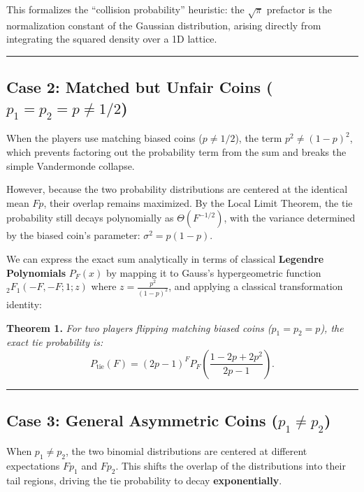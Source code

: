 \documentclass[
  letterpaper,
  DIV=11,
  numbers=noendperiod]{scrartcl}
\begin{document}
This formalizes the ``collision probability'' heuristic: the
\(\sqrt{\pi}\) prefactor is the normalization constant of the Gaussian
distribution, arising directly from integrating the squared density over
a 1D lattice.

\begin{center}\rule{0.5\linewidth}{0.5pt}\end{center}

\subsection{\texorpdfstring{Case 2: Matched but Unfair Coins
(\(p_1 = p_2 = p \neq 1/2\))}{Case 2: Matched but Unfair Coins (p\_1 = p\_2 = p \textbackslash neq 1/2)}}\label{case-2-matched-but-unfair-coins-p_1-p_2-p-neq-12}

When the players use matching biased coins (\(p \neq 1/2\)), the term
\(p^2 \neq (1-p)^2\), which prevents factoring out the probability term
from the sum and breaks the simple Vandermonde collapse.

However, because the two probability distributions are centered at the
identical mean \(F p\), their overlap remains maximized. By the Local
Limit Theorem, the tie probability still decays polynomially as
\(\Theta(F^{-1/2})\), with the variance determined by the biased coin's
parameter: \(\sigma^2 = p(1-p)\).

We can express the exact sum analytically in terms of classical
\textbf{Legendre Polynomials} \(P_F(x)\) by mapping it to Gauss's
hypergeometric function \(_2F_1(-F, -F; 1; z)\) where
\(z = \frac{p^2}{(1-p)^2}\), and applying a classical transformation
identity:

\textbf{Theorem 1.} \emph{For two players flipping matching biased coins
(\(p_1 = p_2 = p\)), the exact tie probability is:} \[
P_{\text{tie}}(F) = (2p - 1)^F P_F\left( \frac{1 - 2p + 2p^2}{2p - 1} \right).
\]

\begin{center}\rule{0.5\linewidth}{0.5pt}\end{center}

\subsection{\texorpdfstring{Case 3: General Asymmetric Coins
(\(p_1 \neq p_2\))}{Case 3: General Asymmetric Coins (p\_1 \textbackslash neq p\_2)}}\label{case-3-general-asymmetric-coins-p_1-neq-p_2}

When \(p_1 \neq p_2\), the two binomial distributions are centered at
different expectations \(F p_1\) and \(F p_2\). This shifts the overlap
of the distributions into their tail regions, driving the tie
probability to decay \textbf{exponentially}.
\end{document}
